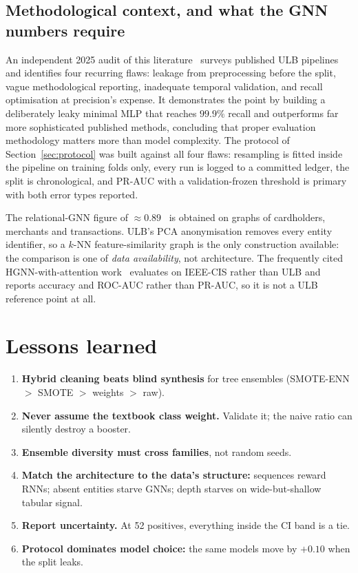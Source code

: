 \documentclass[11pt,a4paper]{article}
\begin{document}
\subsection{Methodological context, and what the GNN numbers require}
An independent 2025 audit of this literature~\cite{leakage2025} surveys published ULB pipelines
and identifies four recurring flaws: leakage from preprocessing before the split, vague
methodological reporting, inadequate temporal validation, and recall optimisation at precision's
expense. It demonstrates the point by building a deliberately leaky minimal MLP that reaches
$99.9\%$ recall and outperforms far more sophisticated published methods, concluding that proper
evaluation methodology matters more than model complexity. The protocol of
Section~\ref{sec:protocol} was built against all four flaws: resampling is fitted inside the
pipeline on training folds only, every run is logged to a committed ledger, the split is
chronological, and PR-AUC with a validation-frozen threshold is primary with both error types
reported.

The relational-GNN figure of $\approx0.89$~\cite{hgae2024} is obtained on graphs of cardholders,
merchants and transactions. ULB's PCA anonymisation removes every entity identifier, so a
$k$-NN feature-similarity graph is the only construction available: the comparison is one of
\emph{data availability}, not architecture. The frequently cited HGNN-with-attention
work~\cite{hgnn2025} evaluates on IEEE-CIS rather than ULB and reports accuracy and ROC-AUC
rather than PR-AUC, so it is not a ULB reference point at all.

\section{Lessons learned}

\begin{enumerate}[leftmargin=*]
      \item \textbf{Hybrid cleaning beats blind synthesis} for tree ensembles
            (SMOTE-ENN $>$ SMOTE $>$ weights $>$ raw).
      \item \textbf{Never assume the textbook class weight.} Validate it; the naive ratio can
            silently destroy a booster.
      \item \textbf{Ensemble diversity must cross families}, not random seeds.
      \item \textbf{Match the architecture to the data's structure:} sequences reward RNNs;
            absent entities starve GNNs; depth starves on wide-but-shallow tabular signal.
      \item \textbf{Report uncertainty.} At 52 positives, everything inside the CI band is a tie.
      \item \textbf{Protocol dominates model choice:} the same models move by $+0.10$ when the
            split leaks.
\end{enumerate}
\end{document}
